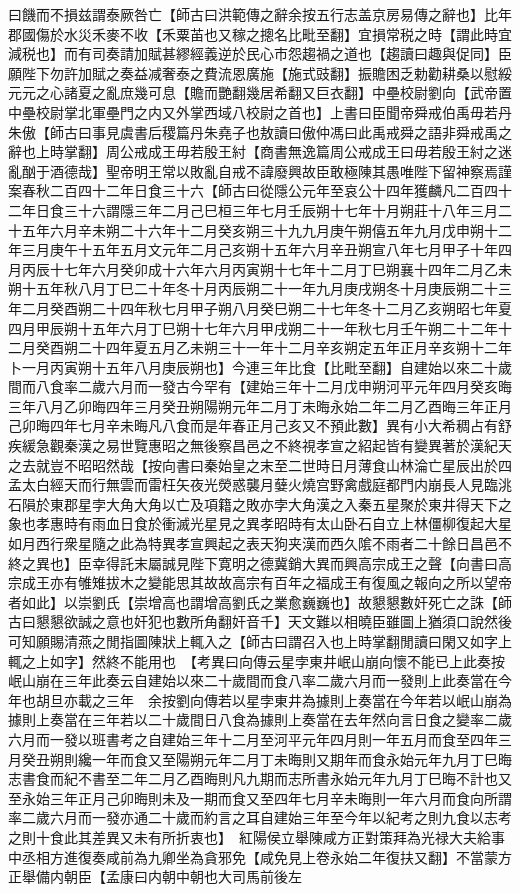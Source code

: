 曰饑而不損兹謂泰厥咎亡【師古曰洪範傳之辭余按五行志盖京房易傳之辭也】比年郡國傷於水災禾麥不收【禾粟苖也又稼之摠名比毗至翻】宜損常税之時【謂此時宜減税也】而有司奏請加賦甚繆經義逆於民心市怨趨禍之道也【趨讀曰趣與促同】臣願陛下勿許加賦之奏益减奢泰之費流恩廣施【施式豉翻】振贍困乏勅勸耕桑以慰綏元元之心諸夏之亂庶幾可息【贍而艷翻幾居希翻又巨衣翻】中壘校尉劉向【武帝置中壘校尉掌北軍壘門之内又外掌西域八校尉之首也】上書曰臣聞帝舜戒伯禹毋若丹朱傲【師古曰事見虞書后稷篇丹朱堯子也敖讀曰傲仲馮曰此禹戒舜之語非舜戒禹之辭也上時掌翻】周公戒成王毋若殷王紂【商書無逸篇周公戒成王曰毋若殷王紂之迷亂酗于酒德哉】聖帝明王常以敗亂自戒不諱廢興故臣敢極陳其愚唯陛下留神察焉謹案春秋二百四十二年日食三十六【師古曰從隱公元年至哀公十四年獲麟凡二百四十二年日食三十六謂隱三年二月己巳桓三年七月壬辰朔十七年十月朔莊十八年三月二十五年六月辛未朔二十六年十二月癸亥朔三十九九月庚午朔僖五年九月戊申朔十二年三月庚午十五年五月文元年二月己亥朔十五年六月辛丑朔宣八年七月甲子十年四月丙辰十七年六月癸卯成十六年六月丙寅朔十七年十二月丁巳朔襄十四年二月乙未朔十五年秋八月丁巳二十年冬十月丙辰朔二十一年九月庚戌朔冬十月庚辰朔二十三年二月癸酉朔二十四年秋七月甲子朔八月癸巳朔二十七年冬十二月乙亥朔昭七年夏四月甲辰朔十五年六月丁巳朔十七年六月甲戌朔二十一年秋七月壬午朔二十二年十二月癸酉朔二十四年夏五月乙未朔三十一年十二月辛亥朔定五年正月辛亥朔十二年卜一月丙寅朔十五年八月庚辰朔也】今連三年比食【比毗至翻】自建始以來二十歲間而八食率二歲六月而一發古今罕有【建始三年十二月戊申朔河平元年四月癸亥晦三年八月乙卯晦四年三月癸丑朔陽朔元年二月丁未晦永始二年二月乙酉晦三年正月己卯晦四年七月辛未晦凡八食而是年春正月己亥又不預此數】異有小大希稠占有舒疾緩急觀秦漢之易世覽惠昭之無後察昌邑之不終視孝宣之紹起皆有變異著於漢紀天之去就豈不昭昭然哉【按向書曰秦始皇之末至二世時日月薄食山林淪亡星辰出於四孟太白經天而行無雲而雷枉矢夜光熒惑襲月㜸火燒宫野禽戲庭都門内崩長人見臨洮石隕於東郡星孛大角大角以亡及項籍之敗亦孛大角漢之入秦五星聚於東井得天下之象也孝惠時有雨血日食於衝滅光星見之異孝昭時有太山卧石自立上林僵柳復起大星如月西行衆星隨之此為特異孝宣興起之表天狗夹漢而西久隂不雨者二十餘日昌邑不終之異也】臣幸得託末屬誠見陛下寛明之德冀銷大異而興高宗成王之聲【向書曰高宗成王亦有雊雉拔木之變能思其故故高宗有百年之福成王有復風之報向之所以望帝者如此】以崇劉氏【崇增高也謂增高劉氏之業愈巍巍也】故懇懇數奸死亡之誅【師古曰懇懇欲誠之意也奸犯也數所角翻奸音千】天文難以相曉臣雖圖上猶須口說然後可知願賜清燕之閒指圖陳狀上輒入之【師古曰謂召入也上時掌翻閒讀曰閑又如字上輒之上如字】然終不能用也　【考異曰向傳云星孛東井岷山崩向懷不能已上此奏按岷山崩在三年此奏云自建始以來二十歲間而食八率二歲六月而一發則上此奏當在今年也胡旦亦載之三年　余按劉向傳若以星孛東井為據則上奏當在今年若以岷山崩為據則上奏當在三年若以二十歲間日八食為據則上奏當在去年然向言日食之變率二歲六月而一發以班書考之自建始三年十二月至河平元年四月則一年五月而食至四年三月癸丑朔則纔一年而食又至陽朔元年二月丁未晦則又期年而食永始元年九月丁巳晦志書食而紀不書至二年二月乙酉晦則凡九期而志所書永始元年九月丁巳晦不計也又至永始三年正月己卯晦則未及一期而食又至四年七月辛未晦則一年六月而食向所謂率二歲六月而一發亦通二十歲而約言之耳自建始三年至今年以紀考之則九食以志考之則十食此其差異又未有所折衷也】　紅陽侯立舉陳咸方正對策拜為光禄大夫給事中丞相方進復奏咸前為九卿坐為貪邪免【咸免見上卷永始二年復扶又翻】不當蒙方正舉備内朝臣【孟康曰内朝中朝也大司馬前後左